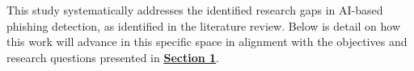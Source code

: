 
This study systematically addresses the identified research gaps in AI-based phishing detection, as identified in the literature review. Below is detail on how this work will advance in this specific space in alignment with the objectives and research questions presented in \hyperref[sec:1-introduction]{\uline{\textbf{Section 1}}}.
